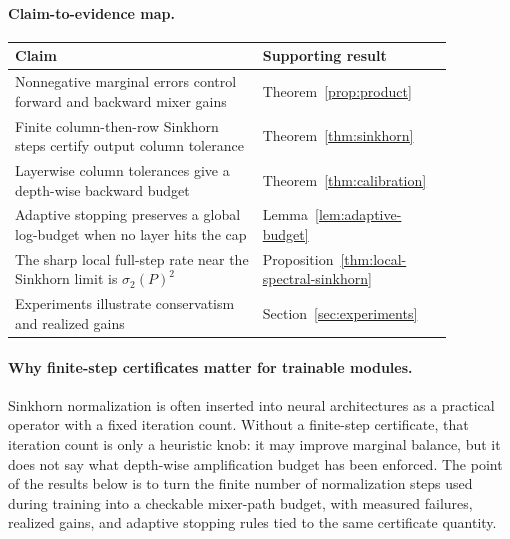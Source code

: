\documentclass[11pt]{article}
\numberwithin{equation}{section}
\theoremstyle{plain}
\theoremstyle{definition}
\theoremstyle{remark}
\begin{document}
\paragraph{Claim-to-evidence map.}
\begin{center}
\small
\begin{tabular}{p{0.52\linewidth}p{0.35\linewidth}}
\toprule
Claim & Supporting result \\
\midrule
Nonnegative marginal errors control forward and backward mixer gains
& Theorem~\ref{prop:product} \\
Finite column-then-row Sinkhorn steps certify output column tolerance
& Theorem~\ref{thm:sinkhorn} \\
Layerwise column tolerances give a depth-wise backward budget
& Theorem~\ref{thm:calibration} \\
Adaptive stopping preserves a global log-budget when no layer hits the cap
& Lemma~\ref{lem:adaptive-budget} \\
The sharp local full-step rate near the Sinkhorn limit is \(\sigma_2(P)^2\)
& Proposition~\ref{thm:local-spectral-sinkhorn} \\
Experiments illustrate conservatism and realized gains
& Section~\ref{sec:experiments} \\
\bottomrule
\end{tabular}
\end{center}

\paragraph{Why finite-step certificates matter for trainable modules.}
Sinkhorn normalization is often inserted into neural architectures as a practical
operator with a fixed iteration count.  Without a finite-step certificate, that
iteration count is only a heuristic knob: it may improve marginal balance, but it
does not say what depth-wise amplification budget has been enforced.  The point
of the results below is to turn the finite number of normalization steps used
during training into a checkable mixer-path budget, with measured failures,
realized gains, and adaptive stopping rules tied to the same certificate
quantity.
\end{document}

